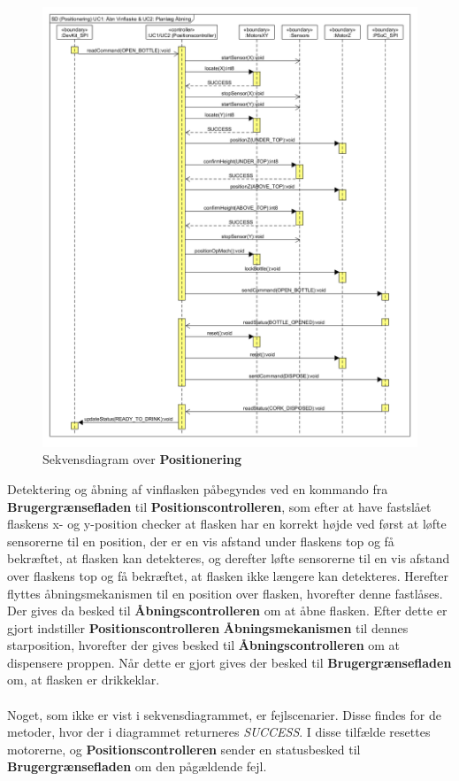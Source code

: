 \begin{figure}[H]
	\centerline{\includegraphics[scale=0.33]{tex/Design/PSoC/Diagrammer/SD_Positionering}}
	\caption{Sekvensdiagram over \textbf{Positionering}}
	\label{sd:Pos}
\end{figure}

\noindent Detektering og åbning af vinflasken påbegyndes ved en kommando fra \textbf{Brugergrænsefladen} til \textbf{Positionscontrolleren}, som efter at have fastslået flaskens x- og y-position checker at flasken har en korrekt højde ved først at løfte sensorerne til en position, der er en vis afstand under flaskens top og få bekræftet, at flasken kan detekteres, og derefter løfte sensorerne til en vis afstand over flaskens top og få bekræftet, at flasken ikke længere kan detekteres. Herefter flyttes åbningsmekanismen til en position over flasken, hvorefter denne fastlåses. Der gives da besked til \textbf{Åbningscontrolleren} om at åbne flasken. Efter dette er gjort indstiller \textbf{Positionscontrolleren} \textbf{Åbningsmekanismen} til dennes starposition, hvorefter der gives besked til \textbf{Åbningscontrolleren} om at dispensere proppen. Når dette er gjort gives der besked til \textbf{Brugergrænsefladen} om, at flasken er drikkeklar. \\
\\
Noget, som ikke er vist i sekvensdiagrammet, er fejlscenarier. Disse findes for de metoder, hvor der i diagrammet returneres \textit{SUCCESS}. I disse tilfælde resettes motorerne, og \textbf{Positionscontrolleren} sender en statusbesked til \textbf{Brugergrænsefladen} om den pågældende fejl.

